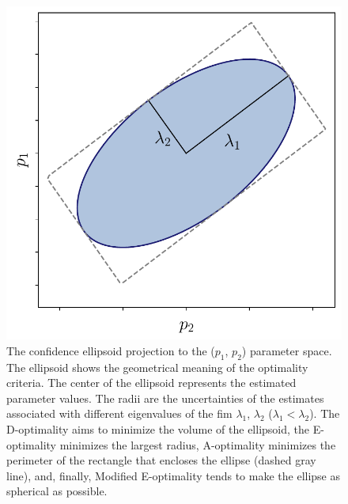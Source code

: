 \documentclass[10pt,A4paper]{article}
\begin{document}
\begin{figure}[H]
    \centering
    \includegraphics[scale=0.6]{Figures/optimality_criteria.pdf}
    \caption{{\footnotesize The confidence ellipsoid projection to the ($p_1$, $p_2$) parameter space. 
    The ellipsoid shows the geometrical meaning of the optimality criteria. 
    The center of the ellipsoid represents the estimated parameter values.
    The radii are the uncertainties of the estimates associated with different eigenvalues of the \ac{fim} $\lambda_1$, $\lambda_2$ ($\lambda_1 < \lambda_2$).
    The D-optimality aims to minimize the volume of the ellipsoid, the E-optimality minimizes the largest radius, A-optimality minimizes the perimeter of the rectangle that encloses the ellipse (dashed gray line), and, finally,  Modified E-optimality tends to make the ellipse as spherical as possible.}}
    \label{fig:opt_criteria}
\end{figure}
%
\end{document}
